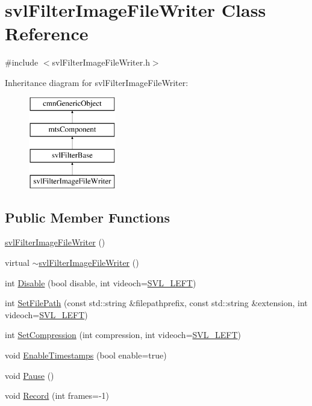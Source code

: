 \hypertarget{classsvl_filter_image_file_writer}{}\section{svl\+Filter\+Image\+File\+Writer Class Reference}
\label{classsvl_filter_image_file_writer}


{\ttfamily \#include $<$svl\+Filter\+Image\+File\+Writer.\+h$>$}

Inheritance diagram for svl\+Filter\+Image\+File\+Writer\+:\begin{figure}[H]
\begin{center}
\leavevmode
\includegraphics[height=4.000000cm]{db/dd0/classsvl_filter_image_file_writer}
\end{center}
\end{figure}
\subsection*{Public Member Functions}
\begin{DoxyCompactItemize}
\item 
\hyperlink{classsvl_filter_image_file_writer_ad8e4e4440cf4fe0ea14649495fc4e220}{svl\+Filter\+Image\+File\+Writer} ()
\item 
virtual \hyperlink{classsvl_filter_image_file_writer_a06cad16c566fa7b00c0669dbc11bb8d9}{$\sim$svl\+Filter\+Image\+File\+Writer} ()
\item 
int \hyperlink{classsvl_filter_image_file_writer_a40aaf6cacaf9bf36bbf32d4cd2f3e0be}{Disable} (bool disable, int videoch=\hyperlink{svl_definitions_8h_ab9fec7615f19c8df2919eebcab0b187f}{S\+V\+L\+\_\+\+L\+E\+F\+T})
\item 
int \hyperlink{classsvl_filter_image_file_writer_a6ec1a9ddd849c3d71469bb86a666acd5}{Set\+File\+Path} (const std\+::string \&filepathprefix, const std\+::string \&extension, int videoch=\hyperlink{svl_definitions_8h_ab9fec7615f19c8df2919eebcab0b187f}{S\+V\+L\+\_\+\+L\+E\+F\+T})
\item 
int \hyperlink{classsvl_filter_image_file_writer_a2674429141ffebd271507dc77603ef87}{Set\+Compression} (int compression, int videoch=\hyperlink{svl_definitions_8h_ab9fec7615f19c8df2919eebcab0b187f}{S\+V\+L\+\_\+\+L\+E\+F\+T})
\item 
void \hyperlink{classsvl_filter_image_file_writer_a8c59ebfc5b6c2a2a228cba756ff3dee7}{Enable\+Timestamps} (bool enable=true)
\item 
void \hyperlink{classsvl_filter_image_file_writer_ae16a97119e0b0036453324fcb816a031}{Pause} ()
\item 
void \hyperlink{classsvl_filter_image_file_writer_a5eee7896d9b546a2714cb3fcff46e188}{Record} (int frames=-\/1)
\end{DoxyCompactItemize}
